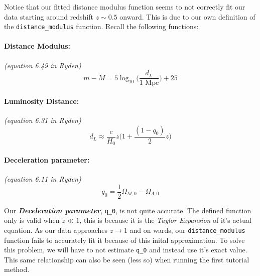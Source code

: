 \documentclass[11pt]{article}
\begin{document}
    Notice that our fitted distance modulus function seems to not correctly
fit our data starting around redshift \(z \sim 0.5\) onward. This is due
to our own definition of the \texttt{distance\_modulus} function. Recall
the following functions:

\hypertarget{distance-modulus}{%
\paragraph{Distance Modulus:}\label{distance-modulus}}

\emph{(equation 6.49 in Ryden)} \[
m - M = 5\log_{10}\Big(\frac{d_L}{1 \text{ Mpc}}\Big) + 25
\]

\hypertarget{luminosity-distance}{%
\paragraph{Luminosity Distance:}\label{luminosity-distance}}

\emph{(equation 6.31 in Ryden)} \[
d_L \approx \frac{c}{H_0}z\Big(1+\frac{(1-q_0)}{2}z\Big)
\]

\hypertarget{deceleration-parameter}{%
\paragraph{Deceleration parameter:}\label{deceleration-parameter}}

\emph{(equation 6.11 in Ryden)} \[
q_0 = \frac{1}{2}\Omega_{M,0}-\Omega_{\Lambda,0}
\]

Our \textbf{\emph{Deceleration parameter}}, \texttt{q\_0}, is not quite
accurate. The defined function only is valid when \(z \ll 1\), this is
because it is the \emph{Taylor Expansion} of it's actual equation. As
our data approaches \(z \rightarrow 1\) and on wards, our
\texttt{distance\_modulus} function fails to accurately fit it because
of this inital approximation. To solve this problem, we will have to not
estimate \texttt{q\_0} and instead use it's exact value. This same
relationship can also be seen (less so) when running the first tutorial
method.
\end{document}
